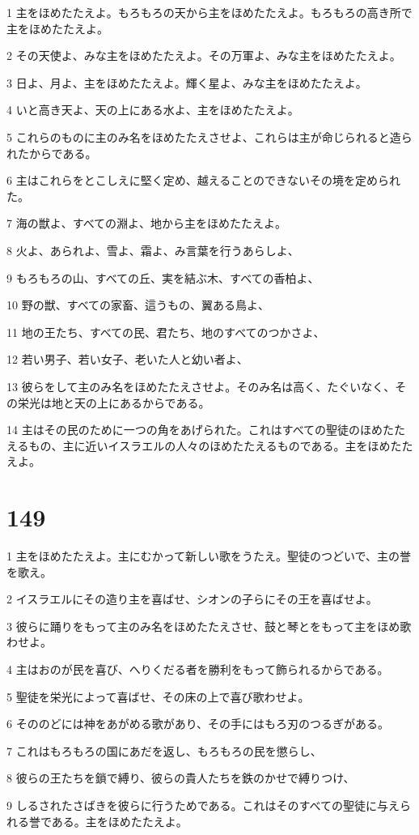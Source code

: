 \par 1 主をほめたたえよ。もろもろの天から主をほめたたえよ。もろもろの高き所で主をほめたたえよ。
\par 2 その天使よ、みな主をほめたたえよ。その万軍よ、みな主をほめたたえよ。
\par 3 日よ、月よ、主をほめたたえよ。輝く星よ、みな主をほめたたえよ。
\par 4 いと高き天よ、天の上にある水よ、主をほめたたえよ。
\par 5 これらのものに主のみ名をほめたたえさせよ、これらは主が命じられると造られたからである。
\par 6 主はこれらをとこしえに堅く定め、越えることのできないその境を定められた。
\par 7 海の獣よ、すべての淵よ、地から主をほめたたえよ。
\par 8 火よ、あられよ、雪よ、霜よ、み言葉を行うあらしよ、
\par 9 もろもろの山、すべての丘、実を結ぶ木、すべての香柏よ、
\par 10 野の獣、すべての家畜、這うもの、翼ある鳥よ、
\par 11 地の王たち、すべての民、君たち、地のすべてのつかさよ、
\par 12 若い男子、若い女子、老いた人と幼い者よ、
\par 13 彼らをして主のみ名をほめたたえさせよ。そのみ名は高く、たぐいなく、その栄光は地と天の上にあるからである。
\par 14 主はその民のために一つの角をあげられた。これはすべての聖徒のほめたたえるもの、主に近いイスラエルの人々のほめたたえるものである。主をほめたたえよ。

\chapter{149}

\par 1 主をほめたたえよ。主にむかって新しい歌をうたえ。聖徒のつどいで、主の誉を歌え。
\par 2 イスラエルにその造り主を喜ばせ、シオンの子らにその王を喜ばせよ。
\par 3 彼らに踊りをもって主のみ名をほめたたえさせ、鼓と琴とをもって主をほめ歌わせよ。
\par 4 主はおのが民を喜び、へりくだる者を勝利をもって飾られるからである。
\par 5 聖徒を栄光によって喜ばせ、その床の上で喜び歌わせよ。
\par 6 そののどには神をあがめる歌があり、その手にはもろ刃のつるぎがある。
\par 7 これはもろもろの国にあだを返し、もろもろの民を懲らし、
\par 8 彼らの王たちを鎖で縛り、彼らの貴人たちを鉄のかせで縛りつけ、
\par 9 しるされたさばきを彼らに行うためである。これはそのすべての聖徒に与えられる誉である。主をほめたたえよ。

